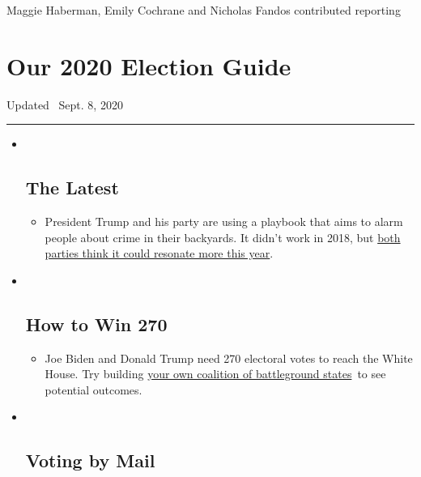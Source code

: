 Maggie Haberman, Emily Cochrane and Nicholas Fandos contributed
reporting

\hypertarget{our-2020-election-guide}{%
\section{Our 2020 Election Guide}\label{our-2020-election-guide}}

Updated ~Sept. 8, 2020

\begin{center}\rule{0.5\linewidth}{\linethickness}\end{center}

\begin{itemize}
\item ~
  \hypertarget{the-latest}{%
  \subsection{The Latest}\label{the-latest}}

  \begin{itemize}
  \item
    President Trump and his party are using a playbook that aims to
    alarm people about crime in their backyards. It didn't work in 2018,
    but
    \href{https://www.nytimes3xbfgragh.onion/2020/09/08/us/politics/trump-republicans-fear-strategy.html?action=click\&pgtype=Article\&state=default\&region=BELOW_MAIN_CONTENT\&context=storylines_guide}{both
    parties think it could resonate more this year}.
  \end{itemize}
\item ~
  \hypertarget{how-to-win-270}{%
  \subsection{How to Win 270}\label{how-to-win-270}}

  \begin{itemize}
  \item
    Joe Biden and Donald Trump need 270 electoral votes to reach the
    White House. Try building
    \href{https://www.nytimes3xbfgragh.onion/interactive/2020/us/elections/election-states-biden-trump.html?action=click\&pgtype=Article\&state=default\&region=BELOW_MAIN_CONTENT\&context=storylines_guide}{your
    own coalition of battleground states}~to see potential outcomes.
  \end{itemize}
\item ~
  \hypertarget{voting-by-mail}{%
  \subsection{Voting by Mail}\label{voting-by-mail}}


\end{itemize}
